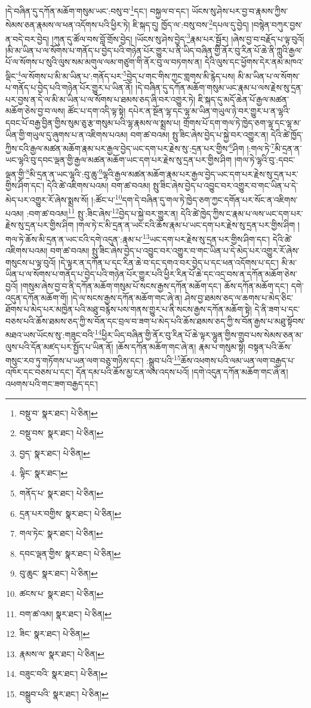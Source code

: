།དེ་བཞིན་དུ་དཀོན་མཆོག་གསུམ་ཡང་:བསུ་བ་\footnote{བསྡུ་བ་  སྣར་ཐང་།  པེ་ཅིན། }དང་། བསྐྱལ་བ་དང་། ཡོངས་སུ་ཤེས་པར་བྱ་བ་རྣམས་ཀྱིས་སེམས་ཅན་རྣམས་ལ་ཕན་འདོགས་པའི་ཕྱིར་ཏེ། ཇི་སྐད་དུ། ཁྱོད་ལ་:བསུ་བས་\footnote{བསྡུ་བས་  སྣར་ཐང་།  པེ་ཅིན། }དཔལ་དུ་བྱེད། །བསྙེན་བཀུར་བྱས་ན་བདེ་བར་བྱེད། །ཀུན་དུ་ཚོལ་བས་བློ་གྲོས་བྱེད། །ཡོངས་སུ་ཤེས་བྱེད་\footnote{བྱད་  སྣར་ཐང་།  པེ་ཅིན། }རྣམ་པར་སྦྱོར། །ཞེས་བྱ་བ་བརྗོད་པ་ལྟ་བུའོ། །མི་མ་ཡིན་པ་ལ་སོགས་པ་གནོད་པ་བྱེད་པའི་གཉེན་པོར་གྱུར་པ་ནི་ཡིད་བཞིན་གྱི་ནོར་བུ་རིན་པོ་ཆེ་ནི་ཀླུའི་རྒྱལ་པོ་ལ་སོགས་པ་སུའི་ལུས་སམ་མགུལ་ལམ་གཙུག་གི་ནོར་བུ་ལ་བཏགས་ན། དེའི་ལུས་དང་ཕྱོགས་དེར་ནམ་མཁའ་ལྡིང་\footnote{ལྟིང་  སྣར་ཐང་། }ལ་སོགས་པ་མི་མ་ཡིན་པ་:གནོད་པར་\footnote{གནོད་པ་  སྣར་ཐང་།  པེ་ཅིན། }བྱེད་པ་གང་གིས་ཀྱང་གླགས་མི་རྙེད་པས། མི་མ་ཡིན་པ་ལ་སོགས་པ་གནོད་པ་བྱེད་པའི་གཉེན་པོར་གྱུར་པ་ཡིན་ནོ། །དེ་བཞིན་དུ་དཀོན་མཆོག་གསུམ་ཡང་རྣམ་པ་ལས་རྗེས་སུ་དྲན་པར་བྱས་ན་དེ་ལ་མི་མ་ཡིན་པ་ལ་སོགས་པ་ཐམས་ཅད་ཞི་བར་འགྱུར་ཏེ། ཇི་སྐད་དུ་མདོ་ཆེན་པོ་རྒྱལ་མཚན་མཆོག་ཅེས་བྱ་བ་ལས། ཚོང་པ་དག་འདི་ལྟ་སྟེ། དཔེར་ན་སྔོན་ལྷ་དང་ལྷ་མ་ཡིན་གཡུལ་ཉེ་བར་གྱུར་པ་ན་ལྷའི་དབང་པོ་བརྒྱ་བྱིན་གྱིས་སུམ་ཅུ་རྩ་གསུམ་པའི་ལྷ་རྣམས་ལ་སྨྲས་པ། གྲོགས་པོ་དག་གལ་ཏེ་ཁྱེད་ཅག་ལྷ་དང་ལྷ་མ་ཡིན་གྱི་གཡུལ་དུ་ཞུགས་པ་ན་འཇིགས་པའམ། བག་ཚ་བའམ། སྤུ་ཟིང་ཞེས་བྱེད་པ་སྐྱེ་བར་འགྱུར་ན། དེའི་ཚེ་ཁྱོད་ཀྱིས་ངའི་རྒྱལ་མཚན་མཆོག་རྣམ་པར་རྒྱལ་བྱེད་ཡང་དག་པར་རྗེས་སུ་:དྲན་པར་གྱིས་\footnote{དྲན་པར་བགྱིས་  སྣར་ཐང་།  པེ་ཅིན། }ཤིག །:གལ་ཏེ་\footnote{གལ་ཏེང་  སྣར་ཐང་།  པེ་ཅིན། }མི་དྲན་ན་ཡང་ལྷའི་བུ་དབང་ལྡན་གྱི་རྒྱལ་མཚན་མཆོག་ཡང་དག་པར་རྗེས་སུ་དྲན་པར་གྱིས་ཤིག །གལ་ཏེ་ལྷའི་བུ་:དབང་ལྡན་གྱི་\footnote{དབང་ལྡན་གྱིས་  སྣར་ཐང་།  པེ་ཅིན། }མི་དྲན་ན་ཡང་ལྷའི་:བུ་ཆུ་\footnote{བུ་ཆུང་  སྣར་ཐང་།  པེ་ཅིན། }ལྷའི་རྒྱལ་མཚན་མཆོག་རྣམ་པར་རྒྱལ་བྱེད་ཡང་དག་པར་རྗེས་སུ་དྲན་པར་གྱིས་ཤིག་དང་། དེའི་ཚེ་འཇིགས་པའམ། བག་ཚ་བའམ། སྤུ་ཟིང་ཞེས་བྱེད་པ་འབྱུང་བར་འགྱུར་བ་གང་ཡིན་པ་དེ་མེད་པར་འགྱུར་རོ་ཞེས་སྨྲས་སོ། །:ཚོང་པ་\footnote{ཚངས་པ་  སྣར་ཐང་།  པེ་ཅིན། }དག་དེ་བཞིན་དུ་གལ་ཏེ་ཁྱེད་ཅག་ཀྱང་དགོན་པར་སོང་ན་འཇིགས་པའམ། :བག་ཚ་བའམ།\footnote{བག་ཚ་འམ།  སྣར་ཐང་།  པེ་ཅིན། } སྤུ་:ཟིང་ཞེས་\footnote{ཟིང་  སྣར་ཐང་།  པེ་ཅིན། }བྱེད་པ་སྐྱེ་བར་གྱུར་ན། དེའི་ཚེ་ཁྱེད་ཀྱིས་ང་རྣམ་པ་ལས་ཡང་དག་པར་རྗེས་སུ་དྲན་པར་གྱིས་ཤིག །གལ་ཏེ་ང་མི་དྲན་ན་ཡང་ངའི་ཆོས་རྣམ་པ་ཡང་དག་པར་རྗེས་སུ་དྲན་པར་གྱིས་ཤིག །གལ་ཏེ་ཆོས་མི་དྲན་ན་ཡང་ངའི་དགེ་འདུན་:རྣམ་པ་\footnote{རྣམས་ལ་  སྣར་ཐང་།  པེ་ཅིན། }ཡང་དག་པར་རྗེས་སུ་དྲན་པར་གྱིས་ཤིག་དང་། དེའི་ཚེ་འཇིགས་པའམ། བག་ཚ་བའམ། སྤུ་ཟིང་ཞེས་བྱེད་པ་འབྱུང་བར་འགྱུར་བ་གང་ཡིན་པ་དེ་མེད་པར་འགྱུར་རོ་ཞེས་གསུངས་པ་ལྟ་བུའོ། །དེ་ལྟར་ན་དཀོན་པ་དང་རིན་ཆེ་བ་དང་དགའ་བར་བྱེད་པ་དང་ཕན་འདོགས་པ་དང་། མི་མ་ཡིན་པ་ལ་སོགས་པ་གནོད་པ་བྱེད་པའི་གཉེན་པོར་གྱུར་པའི་ཕྱིར་རིན་པོ་ཆེ་དང་འདྲ་བས་ན་དཀོན་མཆོག་ཅེས་བྱའོ། །གསུམ་ཞེས་བྱ་བ་ནི་དཀོན་མཆོག་གསུམ་པོ་སངས་རྒྱས་དཀོན་མཆོག་དང་། ཆོས་དཀོན་མཆོག་དང་། དགེ་འདུན་དཀོན་མཆོག་གོ། །དེ་ལ་སངས་རྒྱས་དཀོན་མཆོག་གང་ཞེ་ན། ཤེས་བྱ་ཐམས་ཅད་ལ་ཆགས་པ་མེད་ཅིང་ཐོགས་པ་མེད་པར་མཁྱེན་པའི་མཐུ་བརྙེས་པས་གནས་གྱུར་པ་ནི་སངས་རྒྱས་དཀོན་མཆོག་སྟེ། དེ་ནི་ཟག་པ་དང་བཅས་པའི་ཆོས་ཐམས་ཅད་ཀྱི་ས་བོན་དང་བྲལ་བ་ཟག་པ་མེད་པའི་ཆོས་ཐམས་ཅད་ཀྱི་ས་བོན་རྒྱས་པ་མཐུ་སྟོབས་མཐའ་ཡས་ཡོངས་སུ་:གཟུང་བའི་\footnote{བཟུང་བའི་  སྣར་ཐང་།  པེ་ཅིན། }ཕྱིར་ཡིད་བཞིན་གྱི་ནོར་བུ་རིན་པོ་ཆེ་ལྟར་ལྷུན་གྱིས་གྲུབ་པས་སེམས་ཅན་མ་ལུས་པའི་དོན་མཛད་པར་སྤྱོད་པ་ཡིན་ནོ། །ཆོས་དཀོན་མཆོག་གང་ཞེ་ན། རྣམ་པ་གསུམ་སྟེ། བསྟན་པའི་ཆོས་གསུང་རབ་ཏུ་གཏོགས་པ་ཡན་ལག་བཅུ་གཉིས་དང་། :སྒྲུབ་པའི་\footnote{བསྒྲུབ་པའི་  སྣར་ཐང་།  པེ་ཅིན། }ཆོས་འཕགས་པའི་ལམ་ཡན་ལག་བརྒྱད་པ་འཁོར་དང་བཅས་པ་དང་། དོན་དམ་པའི་ཆོས་མྱ་ངན་ལས་འདས་པའོ། །དགེ་འདུན་དཀོན་མཆོག་གང་ཞེ་ན། འཕགས་པའི་གང་ཟག་བརྒྱད་དང་། 
